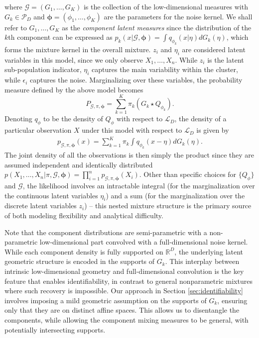 \documentclass[bj,authoryear]{imsart}
\theoremstyle{plain}
\theoremstyle{remark}
\def\bphi{{\boldsymbol\phi}}
\def\bbR{\mathbb{R}}
\def\cG{\mathcal{G}}
\def\cL{\mathcal{L}}
\def\cP{\mathcal{P}}
\begin{document}
where $\cG=(G_1,\dots,G_K)$ is the collection of the low-dimensional measures with $G_k\in \cP_D$ and $\bphi=(\phi_1,\dots,\phi_K)$ are the parameters for the noise kernel. We shall refer to $G_1,\dots,G_K$ as the \textit{component latent measures} since the distribution of the $k$th component can be expressed as $p_k(x|\cG,\bphi) = \int q_{\phi_k}(x|\eta) dG_k(\eta)$, which forms the mixture kernel in the overall mixture. $z_i$ and $\eta_i$ are considered latent variables in this model, since we only observe $X_1,\dots,X_n$. While $z_i$ is the latent sub-population indicator, $\eta_i$ captures the main variability within the cluster, while $\epsilon_i$ captures the noise. Marginalizing over these variables, the probability measure defined by the above model becomes
\begin{equation}\label{eq:model measure}
    P_{\cG,\pi,\bphi} = \sum_{k=1}^K \pi_k (G_k \star Q_{\phi_k}).
\end{equation}
Denoting $q_\phi$ to be the density of $Q_\phi$ with respect to $\cL_D$, the density of a particular observation $X$ under this model with respect to $\cL_D$ is given by
\begin{align}\label{eq:density}
    p_{\cG,\pi,\bphi}(x) = \sum_{k=1}^K \pi_k \int q_{\phi_k}(x-\eta) dG_k(\eta).
\end{align}
The joint density of all the observations is then simply the product since they are assumed independent and identically distributed $p(X_1,\dots,X_n|\pi,\cG,\bphi) = \prod_{i=1}^n p_{\cG,\pi,\bphi}(X_i)$. Other than specific choices for $\{Q_{\phi}\}$ and $\cG$, the likelihood involves an intractable integral (for the marginalization over the continuous latent variables $\eta_i$) and a sum (for the marginalization over the discrete latent variables $z_i$) -- this nested mixture structure is the primary source of both modeling flexibility and analytical difficulty.

Note that the component distributions are semi-parametric with a non-parametric low-dimensional part convolved with a full-dimensional noise kernel. While each component density is fully supported on $\bbR^D$,  the underlying latent geometric structure is encoded in the supports of $G_k$. This interplay between intrinsic low-dimensional geometry and full-dimensional convolution is the key feature that enables identifiability, in contrast to general nonparametric mixtures where such recovery is impossible.
Our approach in Section \ref{sec:identifiability} involves imposing a mild geometric assumption on the supports of $G_k$, ensuring only that they are on distinct affine spaces. This allows us to disentangle the components, while allowing the component mixing measures to be general, with potentially intersecting supports. 
\end{document}
